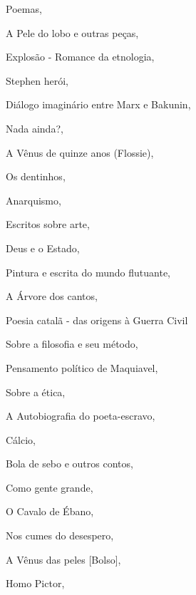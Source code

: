 \begin{multicols}{2}
\begin{enumerate}
{\item Poemas, {}
\item A Pele do lobo e outras peças, {}
\item Explosão - Romance da etnologia, {}
\item Stephen herói, {}
\item Diálogo imaginário entre Marx e Bakunin, {}
\item Nada ainda?, {}
\item A Vênus de quinze anos (Flossie), {}
\item Os dentinhos, {}
\item Anarquismo, {}
\item Escritos sobre arte, {}
\item Deus e o Estado, {}
\item Pintura e escrita do mundo flutuante, {}
\item A Árvore dos cantos, {}
\item Poesia catalã - das origens à Guerra Civil
\item Sobre a filosofia e seu método, {}
\item Pensamento político de Maquiavel, {}
\item Sobre a ética, {}
\item A Autobiografia do poeta-escravo, {}
\item Cálcio, {}
\item Bola de sebo e outros contos, {}
\item Como gente grande, {}
\item O Cavalo de Ébano, {}
\item Nos cumes do desespero, {}
\item A Vênus das peles [Bolso], {}
\item Homo Pictor, {}
}
\end{enumerate}
\end{multicols}
